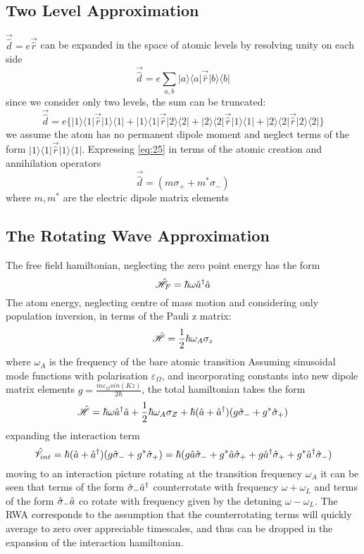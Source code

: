 \subsection{Two Level Approximation}
$\vec{\hat{d}} = e \vec{\hat{r}}$ can be expanded in the space of atomic levels by resolving unity on each side
\begin{equation}
	\vec{\hat{d}} = e \sum_{a, b} | a \rangle \langle a | \vec{\hat{r} }| b \rangle \langle b |
\end{equation}
since we consider only two levels, the sum can be truncated: 
\begin{equation}
	\vec{\hat{d}} = e\{| 1 \rangle \langle 1|\vec{\hat{r}} | 1 \rangle \langle 1 | + | 1 \rangle \langle 1|\vec{\hat{r}} | 2 \rangle \langle 2 | + | 2 \rangle \langle 2|\vec{\hat{r}} | 1 \rangle \langle 1 | + | 2 \rangle \langle 2|\vec{\hat{r}} | 2 \rangle \langle 2 | \}
\label{eq:25}
\end{equation}
we assume the atom has no permanent dipole moment and neglect terms of the form $| 1 \rangle \langle 1|\vec{\hat{r}} | 1 \rangle \langle 1 |$. Expressing \ref{eq:25} in terms of the atomic creation and annihilation operators
\begin{equation}
	\vec{\hat{d}} = (m\sigma_+ + m^* \sigma_-)
\end{equation}
where $m, m^*$ are the electric dipole matrix elements
\subsection{The Rotating Wave Approximation}
The free field hamiltonian, neglecting the zero point energy has the form
\begin{equation}
	\hat{\mathscr{H}}_F =  \hbar \omega \hat{a}^\dagger \hat{a}
\end{equation}
The atom energy, neglecting centre of mass motion and considering only population inversion, in terms of the Pauli z matrix:
\begin{equation}
	\hat{\mathscr{H}} = \frac {1} {2} \hbar \omega_A \sigma_z
\end{equation}
where $\omega_A$ is the frequency of the bare atomic transition
Assuming sinusoidal mode functions with polarisation $\varepsilon_\Omega$, and incorporating constants into new dipole matrix elements $g = \frac{m \varepsilon_\Omega sin(Kz)} {2 \hbar}$, the total hamiltonian takes the form 
\begin{equation}
	\hat{\mathscr{H}} = \hbar \omega \hat{a}^\dagger \hat{a} +\frac{1}{2} \hbar \omega_A \sigma_Z + \hbar (\hat{a} +\hat{a}^\dagger)(g\hat{\sigma}_-+g^*\hat{\sigma}_+)
\end{equation}
expanding the interaction term
\begin{equation}
	\hat{\mathscr{V}}_{int} = \hbar (\hat{a} +\hat{a}^\dagger)(g\hat{\sigma}_-+g^*\hat{\sigma}_+) =  \hbar (g \hat{a} \hat{\sigma}_- + g^* \hat{a} \hat{\sigma}_+ + g \hat{a}^\dagger \hat{\sigma}_+ +g^* \hat{a}^\dagger\hat{\sigma}_-)
\end{equation}
moving to an interaction picture rotating at the transition frequency $\omega_A$ it can be seen that terms of the form $\hat{\sigma}_- \hat{a}^\dagger $ counterrotate with frequency $\omega + \omega_L$ and terms of the form $ \hat{\sigma}_- \hat{a}$ co rotate with frequency given by the detuning $\omega-\omega_L$. The RWA corresponds to the assumption that the counterrotating terms will quickly average to zero over appreciable timescales, and thus can be dropped in the expansion of the interaction hamiltonian.
